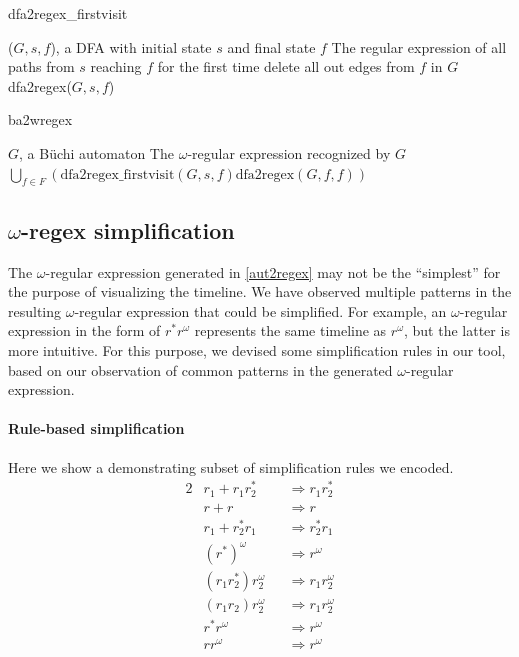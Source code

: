\documentclass[preprint,12pt]{elsarticle}
\theoremstyle{definition}
\theoremstyle{remark}
\newcommand{\Buchi}{B\"{u}chi }
\begin{document}
\begin{algorithm}[h!]
    \caption{dfa2regex\_firstvisit}
    \begin{algorithmic}
        \Require ($G, s, f$), a DFA with initial state $s$ and final state $f$
        \Ensure The regular expression of all paths from $s$ reaching $f$ for the first time
        \State delete all out edges from $f$ in $G$
        \State \Return dfa2regex($G, s, f$)
    \end{algorithmic}
\end{algorithm}

\begin{algorithm}[h!]
    \label{alg:ba2wregex}
    \caption{ba2wregex}
    \begin{algorithmic}
        \Require $G$, a \Buchi automaton
        \Ensure The $\omega$-regular expression recognized by $G$
        \State \Return $\bigcup_{f \in F}\left(\text{dfa2regex\_firstvisit}(G, s, f)\text{\^{}dfa2regex}(G, f, f) \right) $
    \end{algorithmic}
\end{algorithm}

\subsection{$\omega$-regex simplification} \label{regex-simplify}

The $\omega$-regular expression generated in \cref{aut2regex} may not be the ``simplest'' for the purpose of visualizing the timeline. We have observed multiple patterns in the resulting $\omega$-regular expression that could be simplified. For example, an $\omega$-regular expression in the form of $r^*r^{\omega}$ represents the same timeline as $r^{\omega}$, but the latter is more intuitive. For this purpose, we devised some simplification rules in our tool, based on our observation of common patterns in the generated $\omega$-regular expression.

\paragraph*{Rule-based simplification}
Here we show a demonstrating subset of simplification rules we encoded.
\begin{alignat*}{2}
        & r_1 + r_1r_2^* && \Longrightarrow r_1r_2^* \\
        & r + r && \Longrightarrow r \\
        & r_1 + r_2^*r_1 && \Longrightarrow r_2^*r_1 \\
        & (r^*)^{\omega} && \Longrightarrow r^{\omega} \\
        & (r_1r_2^*)r_2^{\omega} && \Longrightarrow r_1r_2^{\omega} \\
        & (r_1r_2)r_2^{\omega} && \Longrightarrow r_1r_2^{\omega} \\
        & r^*r^{\omega} && \Longrightarrow r^{\omega} \\
        & rr^{\omega} && \Longrightarrow r^{\omega}
\end{alignat*}
\end{document}

